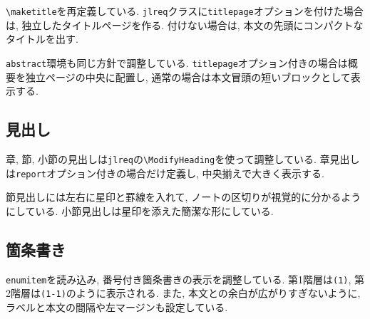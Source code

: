 \documentclass[../main.tex]{subfiles}
\begin{document}
\verb|\maketitle|を再定義している. 
\texttt{jlreq}クラスに\texttt{titlepage}オプションを付けた場合は, 独立したタイトルページを作る. 
付けない場合は, 本文の先頭にコンパクトなタイトルを出す. 

\texttt{abstract}環境も同じ方針で調整している. 
\texttt{titlepage}オプション付きの場合は概要を独立ページの中央に配置し, 通常の場合は本文冒頭の短いブロックとして表示する. 

\subsection{見出し}

章, 節, 小節の見出しは\texttt{jlreq}の\verb|\ModifyHeading|を使って調整している. 
章見出しは\texttt{report}オプション付きの場合だけ定義し, 中央揃えで大きく表示する. 

節見出しには左右に星印と罫線を入れて, ノートの区切りが視覚的に分かるようにしている. 
小節見出しは星印を添えた簡潔な形にしている. 

\subsection{箇条書き}

\texttt{enumitem}を読み込み, 番号付き箇条書きの表示を調整している. 
第1階層は\texttt{(1)}, 第2階層は\texttt{(1-1)}のように表示される. 
また, 本文との余白が広がりすぎないように, ラベルと本文の間隔や左マージンも設定している. 
\end{document}
